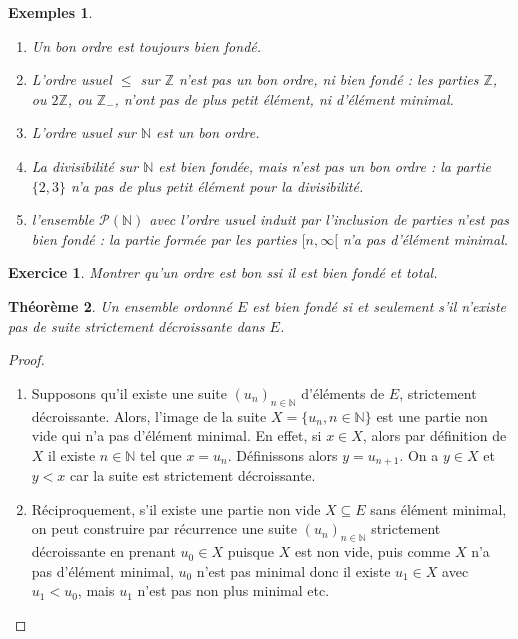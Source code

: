 \documentclass[12pt]{article}
\newtheorem{thm}{Théorème}[section]
\newtheorem*{exo}{Exercice}
\newtheorem{exemples}[thm]{Exemples}
\newcommand{\N}{\mathbb{N}}
\newcommand{\Z}{\mathbb{Z}}
\begin{document}
\begin{exemples}
\begin{enumerate}
\item Un bon ordre est toujours bien fondé.
\item L'ordre usuel $\leq$ sur $\Z$ n'est pas un bon ordre, ni bien fondé : les parties $\Z$, ou $2\Z$, ou $\Z_-$, n'ont pas de plus petit élément, ni d'élément minimal.
\item L'ordre usuel sur $\N$ est un bon ordre.
\item La divisibilité sur $\N$ est bien fondée, mais n'est pas un bon ordre : la partie $\{2,3\}$ n'a pas de plus petit élément pour la divisibilité.
\item l'ensemble $\mathcal P(\N)$ avec l'ordre usuel induit par l'inclusion de parties n'est pas bien fondé : la partie formée par les parties $[n,\infty[$ n'a pas d'élément minimal.
\end{enumerate}
\end{exemples}
 
\begin{exo}
Montrer qu'un ordre est bon ssi il est bien fondé et total.
\end{exo}


\begin{thm}
Un ensemble ordonné $E$ est bien fondé si et seulement s'il n'existe pas de suite strictement décroissante dans $E$.
\end{thm}


\begin{proof}
\begin{enumerate}
\item Supposons qu'il existe une suite $(u_n)_{n\in\N}$ d'éléments de $E$, strictement décroissante. Alors, l'image de la suite $X = \{u_n, n\in\N\}$ est une partie non vide qui n'a pas d'élément minimal. En effet, si $x\in X$, alors par définition de $X$ il existe $n\in \N$ tel que $x=u_n$. Définissons alors $y=u_{n+1}$. On a $y \in X$ et  $y<x$ car la suite est strictement décroissante.
\item Réciproquement, s'il existe une partie non vide $X\subseteq E$ sans élément minimal, on peut construire par récurrence une suite $(u_n)_{n\in\N}$ strictement décroissante en prenant $u_0\in X$ puisque $X$ est non vide, puis comme $X$ n'a pas d'élément minimal, $u_0$ n'est pas minimal donc il existe $u_1 \in X$ avec $u_1 < u_0$, mais $u_1$ n'est pas non plus minimal etc.
\end{enumerate}
\end{proof}
\end{document}
